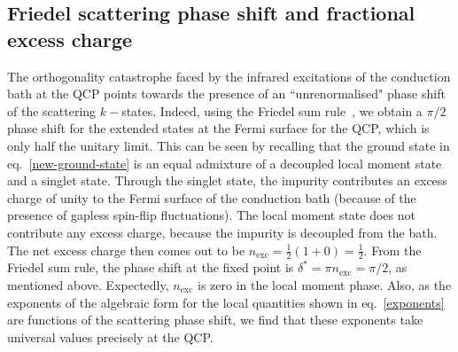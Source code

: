 \documentclass{iopart}
\begin{document}
\subsection{Friedel scattering phase shift and fractional excess charge}\label{excess}
The orthogonality catastrophe faced by the infrared excitations of the conduction bath at the QCP points towards the presence of an ``unrenormalised" phase shift~\cite{anderson1990} of the scattering \(k-\)states. Indeed, using the Friedel sum rule~\cite{friedel_1956,langer1961friedel,langreth1966}, we obtain a \(\pi/2\) phase shift for the extended states at the Fermi surface for the QCP, which is only half the unitary limit. This can be seen by recalling that the ground state in eq.~\eqref{new-ground-state} is an equal admixture of a decoupled local moment state and a singlet state. Through the singlet state, the impurity contributes an excess charge of unity to the Fermi surface of the conduction bath (because of the presence of gapless spin-flip fluctuations). The local moment state does not contribute any excess charge, because the impurity is decoupled from the bath. The net excess charge then comes out to be \(n_\text{exc} = \frac{1}{2}\left( 1 + 0 \right) = \frac{1}{2}\). From the Friedel sum rule, the phase shift at the fixed point is \(\delta^* = \pi n_\text{exc} = \pi /2\), as mentioned above. Expectedly, \(n_\text{exc}\) is zero in the local moment phase. Also, as the exponents of the algebraic form for the local quantities shown in eq.~\eqref{exponents} are functions of the scattering phase shift, we find that these exponents take universal values precisely at the QCP.
\end{document}
